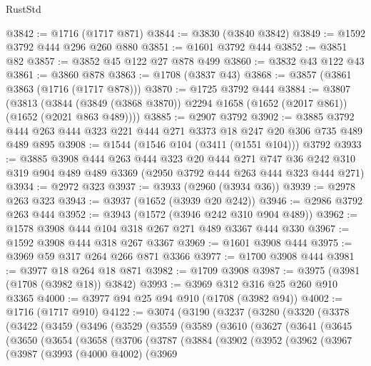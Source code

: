 \begin{lexlean}{RustStd}
\begin{coremodule}
@3842 := @1716 (@1717 @871)
@3844 := @3830 (@3840 @3842)
@3849 := @1592 @3792 @444 @296 @260 @880
@3851 := @1601 @3792 @444
@3852 := @3851 @82
@3857 := @3852 @45 @122 @27 @878 @499
@3860 := @3832 @43 @122 @43
@3861 := @3860 @878
@3863 := @1708 (@3837 @43)
@3868 := @3857 (@3861 @3863 (@1716 (@1717 @878)))
@3870 := @1725 @3792 @444
@3884 := @3807
    (@3813 (@3844 (@3849 (@3868 @3870)) @2294 @1658 (@1652 (@2017 @861)) (@1652 (@2021 @863 @489))))
@3885 := @2907 @3792
@3902 := @3885 @3792 @444 @263 @444 @323 @221 @444 @271 @3373 @18 @247 @20 @306 @735 @489 @489 @895
@3908 := @1544 (@1546 @104 (@3411 (@1551 @104))) @3792
@3933 := @3885
    @3908
    @444
    @263
    @444
    @323
    @20
    @444
    @271
    @747
    @36
    @242
    @310
    @319
    @904
    @489
    @489
    @3369
    (@2950 @3792 @444 @263 @444 @323 @444 @271)
@3934 := @2972 @323
@3937 := @3933 (@2960 (@3934 @36))
@3939 := @2978 @263 @323
@3943 := @3937 (@1652 (@3939 @20 @242))
@3946 := @2986 @3792 @263 @444
@3952 := @3943 (@1572 (@3946 @242 @310 @904 @489))
@3962 := @1578 @3908 @444 @104 @318 @267 @271 @489 @3367 @444 @330
@3967 := @1592 @3908 @444 @318 @267 @3367
@3969 := @1601 @3908 @444
@3975 := @3969 @59 @317 @264 @266 @871 @3366
@3977 := @1700 @3908 @444
@3981 := @3977 @18 @264 @18 @871
@3982 := @1709 @3908
@3987 := @3975 (@3981 (@1708 (@3982 @18)) @3842)
@3993 := @3969 @312 @316 @25 @260 @910 @3365
@4000 := @3977 @94 @25 @94 @910 (@1708 (@3982 @94))
@4002 := @1716 (@1717 @910)
@4122 := @3074
    (@3190
      (@3237
        (@3280
          (@3320
            (@3378
              (@3422
                (@3459
                  (@3496
                    (@3529
                      (@3559
                        (@3589
                          (@3610
                            (@3627
                              (@3641
                                (@3645
                                  (@3650
                                    (@3654
                                      (@3658
                                        (@3706
                                          (@3787
                                            (@3884
                                              (@3902
                                                (@3952
                                                  (@3962
                                                    (@3967
                                                      (@3987
                                                        (@3993
                                                          (@4000 @4002)
                                                          (@3969

\end{coremodule}
\end{lexlean}
